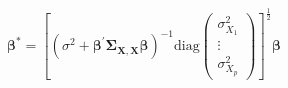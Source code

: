 \begin{equation}
	\boldsymbol{\beta}^{\ast}
	=
	\left[
		\left(
		\sigma^{2}
		+
		\boldsymbol{\beta}^{\prime}
		\boldsymbol{\Sigma}_{\mathbf{X}, \mathbf{X}}
		\boldsymbol{\beta}
		\right)^{-1}
		\mathrm{diag}
		\left(
		\begin{array}{c}
			\sigma_{X_{1}}^{2} \\
			\vdots             \\
			\sigma_{X_{p}}^{2} 
		\end{array}
		\right)
	\right]^{
		\frac{1}{2}
	}
	\boldsymbol{\beta}
	\label{eq:strRegression-betastar-of-theta}
\end{equation}